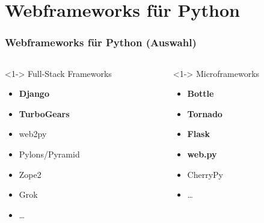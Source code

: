 \documentclass[
    t,
    smaller,
    compress,
    xcolor=svgnames,            %
    table,
]{beamer}
\begin{document}
\section{Webframeworks für Python}
\begin{frame}
  \frametitle{Webframeworks für Python (Auswahl)}

  \begin{columns}[T]
    \begin{column}[T]{.5\textwidth}<1->
        Full-Stack Frameworks
        \vspace{4pt}
        \begin{itemize}[<1->]
            \item \textbf{Django}
            \item \textbf{TurboGears}
            \item web2py
            \item Pylons/Pyramid
            \item Zope2
            \item Grok
            \item \dots
        \end{itemize}
    \end{column}
    \begin{column}[T]{.5\textwidth}<1->
        Microframeworks
        \begin{itemize}[<1->]
            \item \textbf{Bottle}
            \item \textbf{Tornado}
            \item \textbf{Flask}
            \item \textbf{web.py}
            \item CherryPy
            \item \dots
        \end{itemize}
    \end{column}
  \end{columns}

\end{frame}
\end{document}
